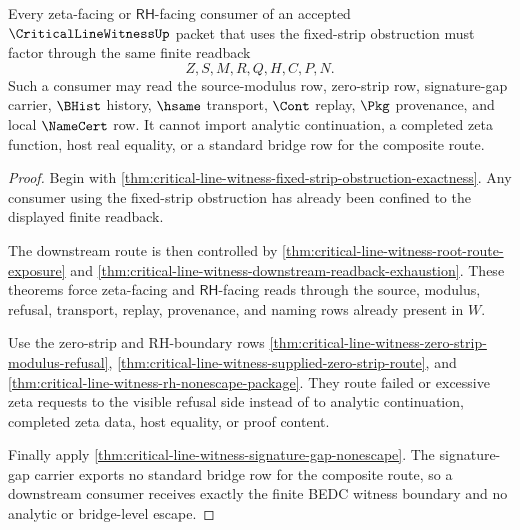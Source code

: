 \begin{theorem}
\label{thm:critical-line-witness-zeta-consumer-nonescape}
Every zeta-facing or $\mathsf{RH}$-facing consumer of an accepted $\CriticalLineWitnessUp$ packet that uses the fixed-strip obstruction must factor through the same finite readback
$$
Z,S,M,R,Q,H,C,P,N.
$$
Such a consumer may read the source-modulus row, zero-strip row, signature-gap carrier, $\BHist$ history, $\hsame$ transport, $\Cont$ replay, $\Pkg$ provenance, and local $\NameCert$ row. It cannot import analytic continuation, a completed zeta function, host real equality, or a standard bridge row for the composite route.
\end{theorem}
\begin{proof}
Begin with \autoref{thm:critical-line-witness-fixed-strip-obstruction-exactness}. Any consumer using the fixed-strip obstruction has already been confined to the displayed finite readback.

The downstream route is then controlled by \autoref{thm:critical-line-witness-root-route-exposure} and \autoref{thm:critical-line-witness-downstream-readback-exhaustion}. These theorems force zeta-facing and $\mathsf{RH}$-facing reads through the source, modulus, refusal, transport, replay, provenance, and naming rows already present in $W$.

Use the zero-strip and RH-boundary rows \autoref{thm:critical-line-witness-zero-strip-modulus-refusal}, \autoref{thm:critical-line-witness-supplied-zero-strip-route}, and \autoref{thm:critical-line-witness-rh-nonescape-package}. They route failed or excessive zeta requests to the visible refusal side instead of to analytic continuation, completed zeta data, host equality, or proof content.

Finally apply \autoref{thm:critical-line-witness-signature-gap-nonescape}. The signature-gap carrier exports no standard bridge row for the composite route, so a downstream consumer receives exactly the finite BEDC witness boundary and no analytic or bridge-level escape.
\end{proof}
